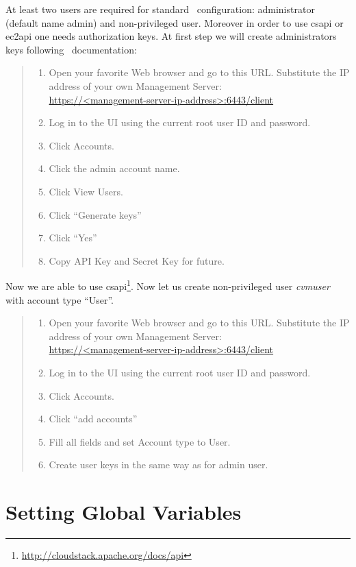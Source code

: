 At least two users are required for standard \cstack\ configuration: administrator (default name admin) and non-privileged user.
Moreover in order to use \acrshort{csapi} or \acrshort{ec2api} one needs authorization keys. 
At first step we will create administrators keys following \cstack\ documentation:
\begin{quote}
	\begin{enumerate}
		\item Open your favorite Web browser and go to this URL.
			Substitute the IP address of your own Management Server:\\
			\url{https://<management-server-ip-address>:6443/client}
		\item Log in to the UI using the current root user ID and password. 
		\item Click Accounts.
		\item Click the admin account name.
		\item Click View Users.
		\item Click ``Generate keys''
		\item Click ``Yes''
		\item Copy API Key and Secret Key for future.
	\end{enumerate}
\end{quote}

Now we are able to use \acrshort{csapi}\footnote{\url{http://cloudstack.apache.org/docs/api}}.
Now let us create non-privileged user \emph{cvmuser} with account type ``User''.
\begin{quote}
	\begin{enumerate}
		\item Open your favorite Web browser and go to this URL.
			Substitute the IP address of your own Management Server:\\
			\url{https://<management-server-ip-address>:6443/client}
		\item Log in to the UI using the current root user ID and password. 
		\item Click Accounts.
		\item Click ``add accounts''
		\item Fill all fields and set Account type to User.
		\item Create user keys in the same way as for admin user.
	\end{enumerate}
\end{quote}


\section{Setting Global Variables}
\label{sct:config:globalvars}

